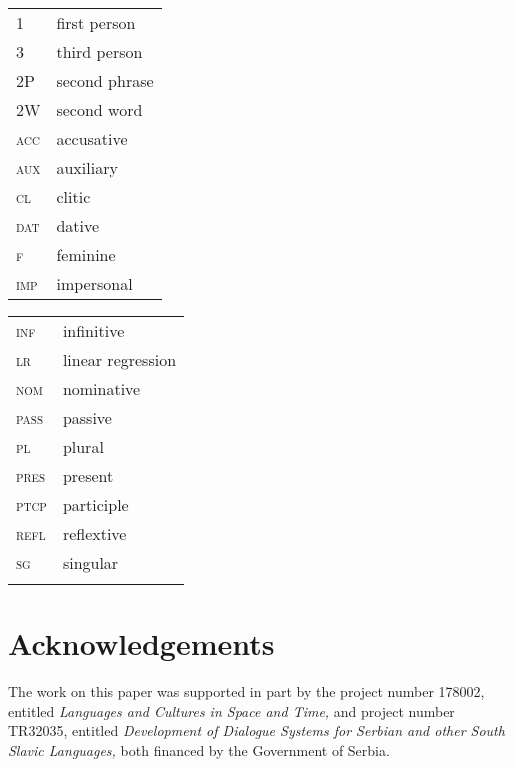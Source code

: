 \documentclass[output=paper,modfonts,newtxmath,hidelinks,]{langscibook}
\begin{document}
\begin{tabularx}{.5\textwidth}{@{}lQ@{}}
\textsc{1}&first person\\
\textsc{3}&third person\\
2P&second phrase\\
2W&second word\\
\textsc{acc}&accusative\\
\textsc{aux}&auxiliary\\
\textsc{cl}&clitic\\
\textsc{dat}&dative\\
\textsc{f}&feminine\\
\textsc{imp}&impersonal\\
\end{tabularx}%
\begin{tabularx}{.5\textwidth}{@{}lQ@{}}
\textsc{inf}&infinitive\\
\textsc{lr}&linear regression\\
\textsc{nom}&nominative\\
\textsc{pass}&passive\\
\textsc{pl}&plural\\
 \textsc{pres}&present\\
\textsc{ptcp}&participle\\
\textsc{refl}&reflextive\\
\textsc{sg}&singular\\
&\\
\end{tabularx}

\section*{Acknowledgements}

The work on this paper was supported in part by the project number 178002, entitled \textit{Languages and Cultures in Space and Time,} and project number TR32035, entitled \textit{Development of Dialogue Systems for Serbian and other South Slavic Languages,} both financed by the Government of Serbia.
\sloppy
\printbibliography[heading=subbibliography,notkeyword=this]
\end{document}
